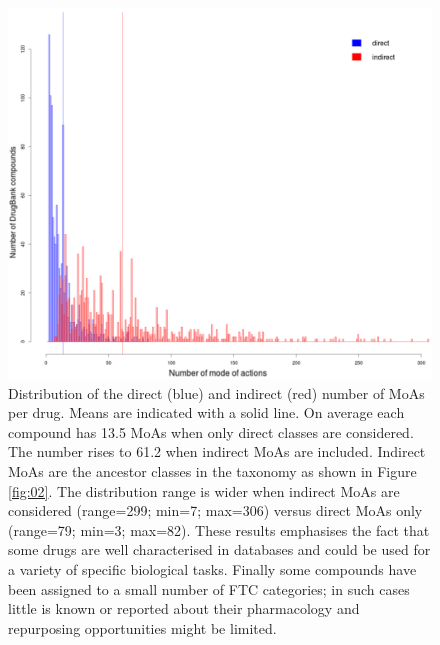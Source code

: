 \documentclass{bioinfo}
\begin{document}
\begin{figure}[!tpb]%
\centerline{\includegraphics{fig3.png}}
\caption{Distribution of the direct (blue) and indirect (red) number of MoAs per drug.
Means are indicated with a solid line. On average each compound has 13.5 MoAs when only direct classes are considered. The number rises
to 61.2 when indirect MoAs are included. Indirect MoAs are the ancestor classes in the taxonomy as shown in Figure \ref{fig:02}.
The distribution range is wider when indirect MoAs are considered (range=299; min=7; max=306) versus direct MoAs only (range=79; min=3; max=82).
These results emphasises the fact that some drugs
are well characterised in databases and could be used for a variety of specific biological tasks. Finally some compounds have been assigned
to a small number of FTC categories; in such cases little is known or reported about their pharmacology and repurposing opportunities
might be limited.}\label{fig:03}
\end{figure}
\end{document}
